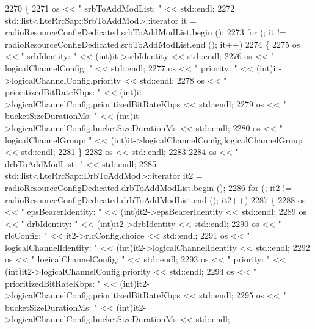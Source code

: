 \begin{DoxyCode}
2270 \{
2271   os << \textcolor{stringliteral}{"   srbToAddModList: "} << std::endl;
2272   std::list<LteRrcSap::SrbToAddMod>::iterator it = radioResourceConfigDedicated.srbToAddModList.begin ();
2273   \textcolor{keywordflow}{for} (; it != radioResourceConfigDedicated.srbToAddModList.end (); it++)
2274     \{
2275       os << \textcolor{stringliteral}{"      srbIdentity: "} << (int)it->srbIdentity << std::endl;
2276       os << \textcolor{stringliteral}{"      logicalChannelConfig: "} << std::endl;
2277       os << \textcolor{stringliteral}{"         priority: "} <<  (\textcolor{keywordtype}{int})it->logicalChannelConfig.priority << std::endl;
2278       os << \textcolor{stringliteral}{"         prioritizedBitRateKbps: "} <<  (int)it->logicalChannelConfig.prioritizedBitRateKbps <<
       std::endl;
2279       os << \textcolor{stringliteral}{"         bucketSizeDurationMs: "} <<  (\textcolor{keywordtype}{int})it->logicalChannelConfig.bucketSizeDurationMs << 
      std::endl;
2280       os << \textcolor{stringliteral}{"         logicalChannelGroup: "} <<  (int)it->logicalChannelConfig.logicalChannelGroup << 
      std::endl;
2281     \}
2282   os << std::endl;
2283 
2284   os << \textcolor{stringliteral}{"   drbToAddModList: "} << std::endl;
2285   std::list<LteRrcSap::DrbToAddMod>::iterator it2 = radioResourceConfigDedicated.drbToAddModList.begin ();
2286   \textcolor{keywordflow}{for} (; it2 != radioResourceConfigDedicated.drbToAddModList.end (); it2++)
2287     \{
2288       os << \textcolor{stringliteral}{"      epsBearerIdentity: "} << (int)it2->epsBearerIdentity << std::endl;
2289       os << \textcolor{stringliteral}{"      drbIdentity: "} << (\textcolor{keywordtype}{int})it2->drbIdentity << std::endl;
2290       os << \textcolor{stringliteral}{"      rlcConfig: "} << it2->rlcConfig.choice << std::endl;
2291       os << \textcolor{stringliteral}{"      logicalChannelIdentity: "} << (int)it2->logicalChannelIdentity << std::endl;
2292       os << \textcolor{stringliteral}{"      logicalChannelConfig: "} << std::endl;
2293       os << \textcolor{stringliteral}{"         priority: "} <<  (\textcolor{keywordtype}{int})it2->logicalChannelConfig.priority << std::endl;
2294       os << \textcolor{stringliteral}{"         prioritizedBitRateKbps: "} <<  (int)it2->logicalChannelConfig.prioritizedBitRateKbps 
      << std::endl;
2295       os << \textcolor{stringliteral}{"         bucketSizeDurationMs: "} <<  (\textcolor{keywordtype}{int})it2->logicalChannelConfig.bucketSizeDurationMs << 
      std::endl;

\end{DoxyCode}
